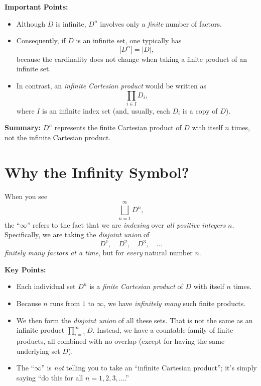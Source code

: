\documentclass[12pt]{article}
\theoremstyle{definition} %
\theoremstyle{plain} %
\begin{document}
\textbf{Important Points:}
\begin{itemize}
    \item Although \(D\) is infinite, \(D^n\) involves only a \emph{finite} number of factors.
    \item Consequently, if \(D\) is an infinite set, one typically has 
          \[
              |D^n| = |D|,
          \]
          because the cardinality does not change when taking a finite product of an infinite set.
    \item In contrast, an \emph{infinite Cartesian product} would be written as
          \[
              \prod_{i\in I} D_i,
          \]
          where \(I\) is an infinite index set (and, usually, each \(D_i\) is a copy of \(D\)).
\end{itemize}

\bigskip
\textbf{Summary:}  
\(D^n\) represents the finite Cartesian product of \(D\) with itself \(n\) times, not the infinite Cartesian product.

\section*{Why the Infinity Symbol?}

When you see
\[
   \bigsqcup_{n=1}^{\infty} D^n,
\]
the ``\(\infty\)'' refers to the fact that we are \emph{indexing} over
\emph{all positive integers} \(n\).  Specifically, we are taking the
\emph{disjoint union} of
\[
   D^1, \quad D^2, \quad D^3, \quad \dots
\]
\emph{finitely many factors at a time}, but for \emph{every} natural number \(n\).

\bigskip

\textbf{Key Points:}
\begin{itemize}
\item Each individual set \(D^n\) is a \emph{finite Cartesian product} of \(D\) with itself \(n\) times.
\item Because \(n\) runs from \(1\) to \(\infty\), we have \emph{infinitely many} such finite products.
\item We then form the \emph{disjoint union} of all these sets.  That is not the same as an infinite product 
      \(\prod_{i=1}^\infty D\). 
      Instead, we have a countable family of finite products, all combined with no overlap (except for having the same underlying set \(D\)).
\item The ``\(\infty\)'' is \emph{not} telling you to take an ``infinite Cartesian product''; 
      it’s simply saying ``do this for all \(n=1,2,3,\dots\).”
\end{itemize}
\end{document}
